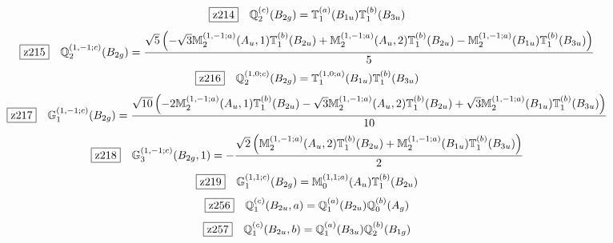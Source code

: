 \documentclass[fleqn,10pt,landscape]{jsarticle}
\begin{document}
\begin{dmath*}
\hspace*{3mm}\fbox{z214}\quad \mathbb{Q}_{2}^{(c)}(B_{2g})=\mathbb{T}_{1}^{(a)}(B_{1u}) \mathbb{T}_{1}^{(b)}(B_{3u})
\end{dmath*}
\begin{dmath*}
\hspace*{3mm}\fbox{z215}\quad \mathbb{Q}_{2}^{(1,-1;c)}(B_{2g})=\frac{\sqrt{5} \left(- \sqrt{3} \mathbb{M}_{2}^{(1,-1;a)}(A_{u},1) \mathbb{T}_{1}^{(b)}(B_{2u}) + \mathbb{M}_{2}^{(1,-1;a)}(A_{u},2) \mathbb{T}_{1}^{(b)}(B_{2u}) - \mathbb{M}_{2}^{(1,-1;a)}(B_{1u}) \mathbb{T}_{1}^{(b)}(B_{3u})\right)}{5}
\end{dmath*}
\begin{dmath*}
\hspace*{3mm}\fbox{z216}\quad \mathbb{Q}_{2}^{(1,0;c)}(B_{2g})=\mathbb{T}_{1}^{(1,0;a)}(B_{1u}) \mathbb{T}_{1}^{(b)}(B_{3u})
\end{dmath*}
\begin{dmath*}
\hspace*{3mm}\fbox{z217}\quad \mathbb{G}_{1}^{(1,-1;c)}(B_{2g})=\frac{\sqrt{10} \left(- 2 \mathbb{M}_{2}^{(1,-1;a)}(A_{u},1) \mathbb{T}_{1}^{(b)}(B_{2u}) - \sqrt{3} \mathbb{M}_{2}^{(1,-1;a)}(A_{u},2) \mathbb{T}_{1}^{(b)}(B_{2u}) + \sqrt{3} \mathbb{M}_{2}^{(1,-1;a)}(B_{1u}) \mathbb{T}_{1}^{(b)}(B_{3u})\right)}{10}
\end{dmath*}
\begin{dmath*}
\hspace*{3mm}\fbox{z218}\quad \mathbb{G}_{3}^{(1,-1;c)}(B_{2g},1)=- \frac{\sqrt{2} \left(\mathbb{M}_{2}^{(1,-1;a)}(A_{u},2) \mathbb{T}_{1}^{(b)}(B_{2u}) + \mathbb{M}_{2}^{(1,-1;a)}(B_{1u}) \mathbb{T}_{1}^{(b)}(B_{3u})\right)}{2}
\end{dmath*}
\begin{dmath*}
\hspace*{3mm}\fbox{z219}\quad \mathbb{G}_{1}^{(1,1;c)}(B_{2g})=\mathbb{M}_{0}^{(1,1;a)}(A_{u}) \mathbb{T}_{1}^{(b)}(B_{2u})
\end{dmath*}
\begin{dmath*}
\hspace*{3mm}\fbox{z256}\quad \mathbb{Q}_{1}^{(c)}(B_{2u},a)=\mathbb{Q}_{1}^{(a)}(B_{2u}) \mathbb{Q}_{0}^{(b)}(A_{g})
\end{dmath*}
\begin{dmath*}
\hspace*{3mm}\fbox{z257}\quad \mathbb{Q}_{1}^{(c)}(B_{2u},b)=\mathbb{Q}_{1}^{(a)}(B_{3u}) \mathbb{Q}_{2}^{(b)}(B_{1g})
\end{dmath*}
\end{document}
